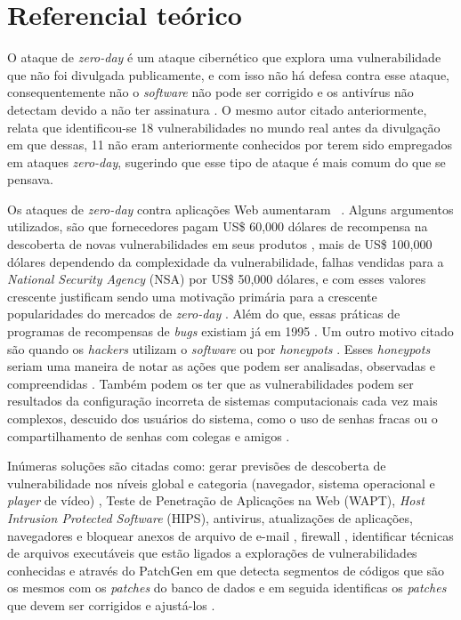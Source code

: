 \section{Referencial teórico}
O ataque de \textit{zero-day} é um ataque cibernético que explora uma vulnerabilidade que não foi divulgada publicamente, e com isso não 
há defesa contra esse ataque, consequentemente não o \textit{software} não pode ser corrigido e os antivírus não detectam devido a não 
ter assinatura \cite{Bilge:2012}. O mesmo autor citado anteriormente, relata que identificou-se 18 vulnerabilidades no mundo real antes 
da divulgação em que dessas, 11 não eram anteriormente conhecidos por terem sido empregados em ataques \textit{zero-day}, sugerindo que 
esse tipo de ataque é mais comum do que se pensava. 

Os ataques de \textit{zero-day} contra aplicações Web aumentaram ~\cite{Kumar:2016}. Alguns argumentos utilizados, são que fornecedores 
pagam US\$ 60,000 dólares de recompensa na descoberta de novas vulnerabilidades em seus produtos \cite{Egelman:2013}, mais de US\$ 
100,000 dólares dependendo da complexidade da vulnerabilidade\cite{Bilge:2012}, falhas vendidas para a \textit{National Security Agency} 
(NSA) por US\$ 50,000 dólares, e com esses valores crescente justificam sendo uma motivação primária para a crescente popularidades do 
mercados de \textit{zero-day} \cite{Egelman:2013}. Além do que, essas práticas de programas de recompensas de \textit{bugs} existiam já 
em 1995 \cite{Egelman:2013}. Um outro motivo citado são quando os \textit{hackers} utilizam o \textit{software} ou por \textit{honeypots} 
\cite{Fotiet:2015}. Esses \textit{honeypots} seriam uma maneira de notar as ações que podem ser analisadas, observadas e compreendidas
\cite{Spitzner:2003}. Também podem os ter que as vulnerabilidades podem ser resultados da configuração incorreta de sistemas 
computacionais cada vez mais complexos, descuido dos usuários do sistema, como o uso de senhas fracas ou o compartilhamento de senhas com 
colegas e amigos \cite{Fotiet:2015}.

Inúmeras soluções são citadas como: gerar previsões de descoberta de vulnerabilidade nos níveis global e categoria 
(navegador, sistema operacional e \textit{player} de vídeo) \cite{Last:2016}, Teste de Penetração de Aplicações na Web (WAPT), 
\textit{Host Intrusion Protected Software} (HIPS), antivirus, atualizações de aplicações, navegadores e bloquear anexos de arquivo
de e-mail \cite{Kumar:2016}, firewall \cite{Last:2016}, identificar técnicas de arquivos executáveis que estão ligados a explorações de vulnerabilidades conhecidas \cite{Bilge:2012} e através do PatchGen em que detecta segmentos de códigos que são os mesmos com os \textit{patches} do banco de dados e em seguida identificas os \textit{patches} que devem ser corrigidos e ajustá-los \cite{Luo:2015}.
